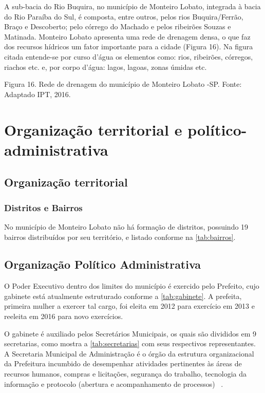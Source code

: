 A sub-bacia do Rio Buquira, no município de Monteiro Lobato, integrada à bacia do Rio Paraíba do Sul, é composta, entre outros, pelos rios Buquira/Ferrão, Braço e Descoberto; pelo córrego do Machado e pelos ribeirões Souzas e Matinada. Monteiro Lobato apresenta uma rede de drenagem densa, o que faz dos recursos hídricos um fator importante para a cidade (Figura 16). Na figura citada entende-se por curso d’água os elementos como: rios, ribeirões, córregos, riachos etc. e, por corpo d’água:  lagos, lagoas, zonas úmidas etc. 


 
Figura 16. Rede de drenagem do município de Monteiro Lobato -SP.
Fonte: Adaptado IPT, 2016.

\section{Organização territorial e político-administrativa}
\subsection{Organização territorial}
\subsubsection{Distritos e Bairros}

No município de Monteiro Lobato não há formação de distritos, possuindo 19 bairros distribuídos por seu território, e listado conforme na \autoref{tab:bairros}.

	

\subsection{Organização Político Administrativa}
O Poder Executivo dentro dos limites do município é exercido pelo Prefeito, cujo gabinete está atualmente estruturado conforme a \autoref{tab:gabinete}. A prefeita, primeira mulher a exercer tal cargo, foi eleita em 2012 para exercício em 2013 e reeleita em 2016 para novo exercícios.

	

O gabinete é auxiliado pelos Secretários Municipais, os quais são divididos em 9 secretarias, como mostra a \autoref{tab:secretarias} com seus respectivos representantes. A Secretaria Municipal de Administração é o órgão da estrutura organizacional da Prefeitura incumbido de desempenhar atividades pertinentes às áreas de recursos humanos, compras e licitações, segurança do trabalho, tecnologia da informação e protocolo (abertura e acompanhamento de processos) ~\cite{MonteiroLobatoSite}.

